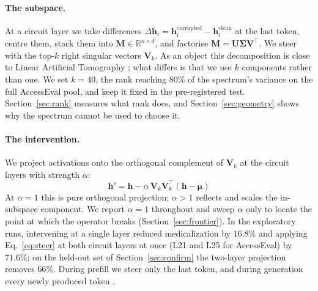 \paragraph{The subspace.} At a circuit layer we take differences $\Delta \mathbf{h}_i =
\mathbf{h}_i^{\text{corrupted}} - \mathbf{h}_i^{\text{clean}}$ at the last token, centre
them, stack them into $\mathbf{M} \in \mathbb{R}^{n \times d}$, and factorise
$\mathbf{M} = \mathbf{U}\boldsymbol{\Sigma}\mathbf{V}^\top$. We steer with the top-$k$
right singular vectors $\mathbf{V}_k$. As an object this decomposition is close to
Linear Artificial Tomography \citep{zou2023representation}; what differs is that we use
$k$ components rather than one. We set $k{=}40$, the rank reaching $80\%$ of the
spectrum's variance on the full AccessEval pool, and keep it fixed in the pre-registered
test. Section~\ref{sec:rank} measures what rank does, and Section~\ref{sec:geometry}
shows why the spectrum cannot be used to choose it.

\paragraph{The intervention.} We project activations onto the orthogonal complement of
$\mathbf{V}_k$ at the circuit layers with strength $\alpha$:
\begin{equation}
\mathbf{h}' = \mathbf{h} - \alpha \, \mathbf{V}_k \mathbf{V}_k^\top (\mathbf{h} - \boldsymbol{\mu})
\label{eq:steer}
\end{equation}
At $\alpha{=}1$ this is pure orthogonal projection; $\alpha>1$ reflects and scales the
in-subspace component. We report $\alpha{=}1$ throughout and sweep $\alpha$ only to
locate the point at which the operator breaks (Section~\ref{sec:frontier}). In the exploratory
runs, intervening at a single layer reduced medicalization by $16.8\%$ and applying
Eq.~\ref{eq:steer} at both circuit layers at once (L21 and L25 for AccessEval) by
$71.6\%$; on the held-out set of Section~\ref{sec:confirm} the two-layer projection
removes $66\%$. During prefill we steer only the last token, and during generation every newly
produced token \citep{li2024inference,todd2024function}.

